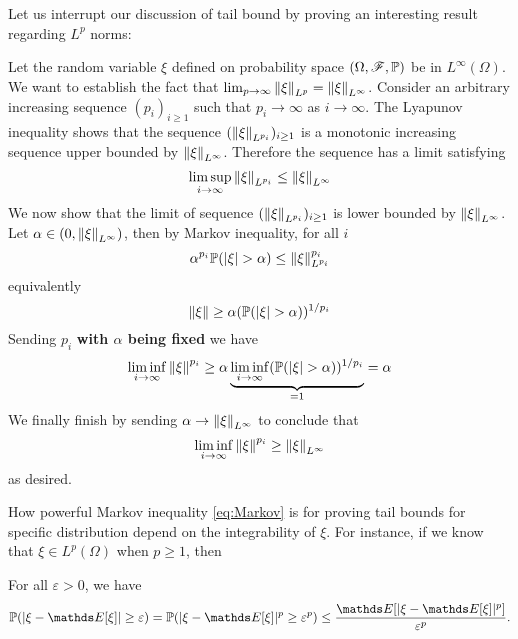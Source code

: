 Let us interrupt our discussion of tail bound by proving an interesting result regarding $L^p$ norms:

\begin{example} Let the random variable $\xi$ defined on probability space $(\Omega,\mathcal{F},\mathbb{P})$ be in $L^\infty(\Omega)$. We want to establish the fact that $\lim_{p \to \infty} \left\| \xi \right\|_{L^p} = \left\| \xi \right\|_{L^\infty}$. Consider an arbitrary increasing sequence $(p_i)_{i \geq 1}$ such that $p_i \to \infty$ as $i \to \infty$. The Lyapunov inequality shows that the sequence $(\left\| \xi \right\|_{L^{p_i}})_{i\geq 1}$ is a monotonic increasing sequence upper bounded by $\left\| \xi \right\|_{L^\infty}$. Therefore the sequence has a limit satisfying
\begin{equation}
    \limsup_{i \to \infty} \left\| \xi \right\|_{L^{p_i}} \leq \left\| \xi \right\|_{L^\infty}
\end{equation}
We now show that the limit of sequence $(\left\| \xi \right\|_{L^{p_i}})_{i\geq 1}$ is lower bounded by $\left\| \xi \right\|_{L^\infty}$. Let $\alpha \in (0,\left\| \xi \right\|_{L^\infty})$, then by Markov inequality, for all $i$
\begin{equation}
    \alpha^{p_i} \mathbb{P}(|\xi| > \alpha) \leq \left\| \xi \right\|^{p_i}_{L^{p_i}} 
\end{equation}
equivalently
\begin{equation}
    \left\| \xi \right\| \geq \alpha (\mathbb{P}(|\xi| > \alpha))^{1/p_i}
\end{equation}
Sending $p_i$ \textbf{with $\alpha$ being fixed} we have
\begin{equation}
    \liminf_{i \to \infty} \left\| \xi \right\|^{p_i} \geq \alpha \underbrace{\liminf_{i \to \infty} (\mathbb{P}(|\xi| > \alpha))^{1/p_i}}_{=1} = \alpha
\end{equation}
We finally finish by sending $\alpha \to \left\| \xi \right\|_{L^\infty}$ to conclude that
\begin{equation}
    \liminf_{i \to \infty} \left\| \xi \right\|^{p_i} \geq \left\| \xi \right\|_{L^\infty}
\end{equation}
as desired.
\end{example}

How powerful Markov inequality \eqref{eq:Markov} is for proving tail bounds for specific distribution depend on the integrability of $\xi$. For instance, if we know that $\xi \in L^p(\Omega)$ when $p \geq 1$, then 

\begin{corollary} For all $\varepsilon > 0$, we have
\begin{equation} \label{eq:Lp_Chebyshev}
    \p(|\xi - \E[\xi]| \ge \varepsilon) = \p(|\xi - \E[\xi]|^p \ge \varepsilon^p) \le \frac{\E[|\xi - \E[\xi]|^p]}{\varepsilon^p}.
\end{equation}
\end{corollary}

